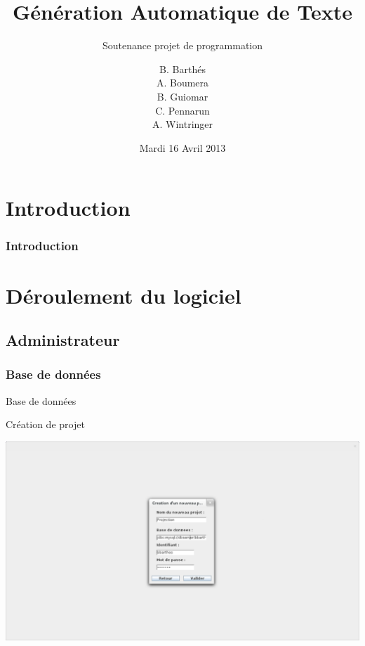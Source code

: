 \documentclass[11pt]{beamer}
\title{Génération Automatique de Texte}
\subtitle{Soutenance projet de programmation}
\author{B. Barthés \\ A. Boumera \\ B. Guiomar \\ C. Pennarun \\ A. Wintringer}
\date{Mardi 16 Avril 2013}
\begin{document}
 
\begin{frame}
\titlepage
\end{frame}

\section*{Introduction}
\begin{frame}\frametitle{Introduction}
\begin{itemize}
\end{itemize}

\end{frame}

\section{Déroulement du logiciel}

\subsection{Administrateur}

\subsubsection{Base de données}
\begin{frame}{Base de données}
\begin{block}{Création de projet}
\begin{center}
\includegraphics[scale=0.2]{db_connection.png}
\end{center}
\end{block}
\end{frame}
\end{document}

